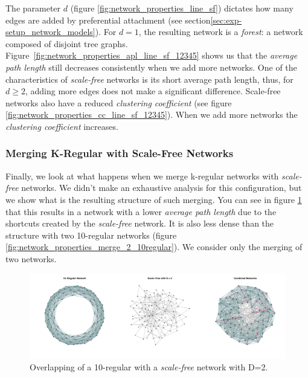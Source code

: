 \documentclass[preprint,number]{elsarticle}
\begin{document}
        The parameter $d$ (figure \ref{fig:network_properties_line_sf}) dictates how many edges are
        added by preferential attachment (see section\ref{sec:exp-setup_network_models}). For $d=1$,
        the resulting network is a \textit{forest}: a network composed of disjoint tree
        graphs. Figure~\ref{fig:network_properties_apl_line_sf_12345} shows us that the
        \textit{average path length} still decreases consistently when we add more networks. One of
        the characteristics of \textit{scale-free} networks is its short average path length, thus,
        for $d \ge 2$, adding more edges does not make a significant difference. Scale-free networks
        also have a reduced \textit{clustering coefficient} (see figure
        \ref{fig:network_properties_cc_line_sf_12345}). When we add more networks the
        \textit{clustering coefficient} increases.

        \subsubsection{Merging K-Regular with Scale-Free Networks}
        \noindent Finally, we look at what happens when we merge k-regular networks with
        \textit{scale-free} networks. We didn't make an exhaustive analysis for this configuration,
        but we show what is the resulting structure of such merging. You can see in figure
        \ref{fig:network_properties_merge_regular_scale-free} that this results in a network with a
        lower \textit{average path length} due to the shortcuts created by the \textit{scale-free}
        network. It is also less dense than the structure with two 10-regular networks (figure
        \ref{fig:network_properties_merge_2_10regular}). We consider only the merging of two
        networks.

        \begin{figure}[H]
          \centering
          \includegraphics[width=1\linewidth]{"../analysis/pdf/network_properties_10regular_2scale-free"}
          \begin{minipage}{0.9\textwidth}
            \caption{Overlapping of a 10-regular with a \textit{scale-free} network with D=2.}
            \label{fig:network_properties_merge_regular_scale-free}
          \end{minipage}
        \end{figure}
\end{document}
